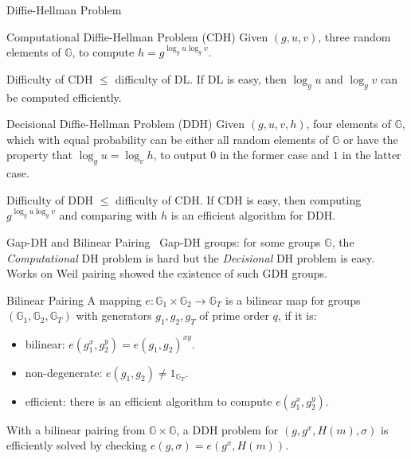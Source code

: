 \begin{frame}{Diffie-Hellman Problem}
\begin{block}{Computational Diffie-Hellman Problem (CDH)}
Given $(g, u, v)$, three random elements of $\mathbb{G}$, to compute $h=g^{\log_g u \log_g v}$. 
\end{block}
\pause 
Difficulty of CDH $\le$ difficulty of DL. If DL is easy, then $\log_g u$
and $\log_g v$ can be computed efficiently. \pause

\begin{block}{Decisional Diffie-Hellman Problem (DDH)}
Given $(g, u, v, h)$, four elements of $\mathbb{G}$, which with equal probability can be either all random elements of $\mathbb{G}$ or have the property that $\log_g u = \log_v h$, to output $0$ in the former case and $1$ in the latter case. 
\end{block}
\pause
Difficulty of DDH $\le$ difficulty of CDH. If CDH is easy, then computing $g^{\log_g u \log_g v}$ and comparing with $h$ is an efficient algorithm for DDH.  

\end{frame}

\begin{frame}{Gap-DH and Bilinear Pairing~\cite{DBLP:conf/crypto/BonehF01}}
Gap-DH groups: for some groups $\mathbb{G}$, the \textit{Computational} DH problem is hard but the \textit{Decisional} DH problem is easy. \\
\pause
Works on Weil pairing showed the existence of such GDH groups. \\
\pause 
\begin{block}{Bilinear Pairing}
    A mapping $e: \mathbb{G}_1\times \mathbb{G}_2\to \mathbb{G}_T$ is a bilinear map for groups $(\mathbb{G}_1, \mathbb{G}_2, \mathbb{G}_T)$ with generators $g_1, g_2, g_T$ of prime order $q$, if it is:
    \begin{itemize}
        \item bilinear: $e(g_1^x, g_2^y) = e(g_1, g_2)^{xy}$. 
        \item non-degenerate: $e(g_1, g_2)\neq 1_{\mathbb{G}_T}$. 
        \item efficient: there is an efficient algorithm to compute $e(g_1^x, g_2^y)$. 
    \end{itemize}
\end{block}
\pause 
With a bilinear pairing from $\mathbb{G}\times \mathbb{G}$, a DDH problem for $(g, g^x, H(m),\sigma)$ is efficiently solved by checking $e(g, \sigma) = e(g^x, H(m))$.
\end{frame}

